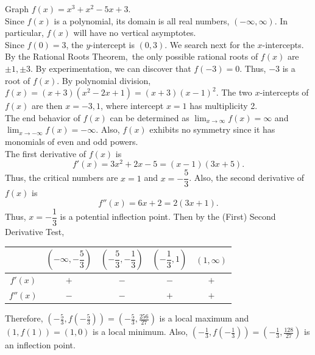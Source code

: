 \documentclass{book}
\begin{document}
\begin{Exam} Graph $f(x) = x^3+x^2-5x+3$. \\

Since $f(x)$ is a polynomial, its domain is all real numbers, $(-\infty, \infty)$. In particular, $f(x)$ will have no vertical asymptotes.\\

 Since $f(0) = 3$, the $y$-intercept is $(0,3)$. We search next for the $x$-intercepts. By the Rational Roots Theorem,\footnotemark\ the only possible rational roots of $f(x)$ are $\pm 1, \pm 3$. By experimentation, we can discover that $f(-3) = 0$. Thus, $-3$ is a root of $f(x)$. By polynomial division, $f(x) = (x+3)(x^2-2x+1) = (x+3)(x-1)^2$. The two $x$-intercepts of $f(x)$ are then $x= -3, 1$, where intercept $x=1$ has multiplicity 2. \\

The end behavior of $f(x)$ can be determined as $\displaystyle\lim_{x\to \infty} f(x) = \infty$ and  $\displaystyle\lim_{x\to -\infty} f(x) = -\infty$. Also, $f(x)$ exhibits no symmetry since it has monomials of even and odd powers.\\

The first derivative of $f(x)$ is \[f'(x) = 3x^2+2x-5 = (x-1)(3x+5).\] Thus, the critical numbers are $x = 1$ and $x= -\dfrac{5}{3}$. Also, the second derivative of $f(x)$ is \[f''(x) = 6x + 2 = 2(3x+1).\] 
Thus, $x = - \dfrac{1}{3}$ is a potential inflection point. Then by the (First) Second Derivative Test, \\
\begin{center}
\begin{tabular}{c|c|c|c|c}
 & $\left(-\infty, -\dfrac{5}{3}\right)$ & $\left(-\dfrac{5}{3}, -\dfrac{1}{3}\right)$ & $\left(-\dfrac{1}{3}, 1\right)$ & $(1, \infty)$ \\ \hline
$f'(x)$ & $+$ & $-$ & $-$ & $+$ \\ %
$f''(x)$ & $-$ & $-$ & $+$ & $+$ \\ %
\end{tabular}
\end{center}\vspace{0.1 in} Therefore, $\left(-\frac{5}{3}, f\left(-\frac{5}{3}\right)\right) = \left(-\frac{5}{3}, \frac{256}{27}\right)$ is a local maximum and $\left(1, f\left(1\right)\right) = \left(1, 0\right)$ is a local minimum. Also, $\left(-\frac{1}{3}, f\left(-\frac{1}{3}\right)\right) = \left(-\frac{1}{3}, \frac{128}{27}\right)$ is an inflection point. \\


\end{Exam}
\end{document}
